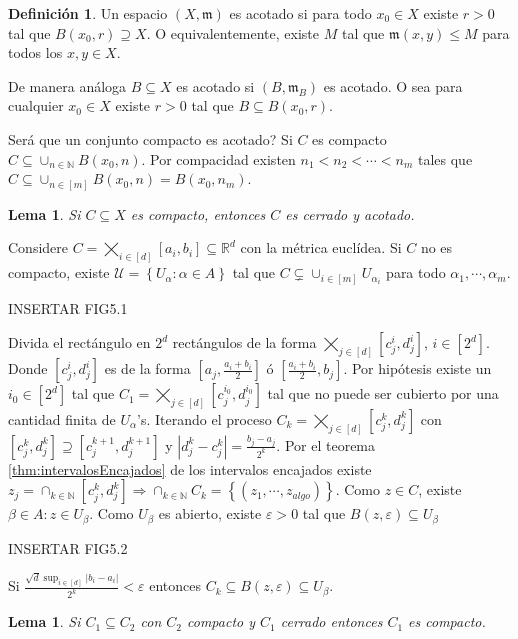 \documentclass[12pt]{article}
\theoremstyle{plain}
\newtheorem{Lem}[Th]{Lema}             %
\theoremstyle{definition}
\newtheorem{Def}[Th]{Definición}       %
\theoremstyle{remark}
\numberwithin{equation}{section}
\newcommand{\bN}{\mathbb{N}}        %
\newcommand{\bR}{\mathbb{R}}        %
\newcommand{\mm}{\mathfrak{m}}      %
\newcommand{\cU}{\mathcal{U}}       %
\renewcommand{\leq}{\leqslant}      %
\renewcommand{\:}{\colon}           %
\newcommand{\conj}[1]{\left\lbrace#1\right\rbrace}
\newcommand{\bonj}[1]{\left\lbrack#1\right\rbrack}
\begin{document}
\begin{multicols}{2}
\begin{Def}
  Un espacio $(X,\mm)$ es acotado si para todo $x_0\in X$ existe $r>0$ tal que $B(x_0,r)\supseteq X$. O equivalentemente, existe $M$ tal que $\mm(x,y)\leq M$ para todos los $x,y\in X$.\par
  De manera análoga $B\subseteq X$ es acotado si $(B,\mm_B)$ es acotado. O sea para cualquier $x_0\in X$ existe $r>0$ tal que $B\subseteq B(x_0,r)$.
\end{Def}
Será que un conjunto compacto es acotado? Si $C$ es compacto $C\subseteq\cup_{n\in\bN}B(x_0,n)$. Por compacidad existen $n_1<n_2<\cdots<n_m$ tales que $C\subseteq\cup_{n\in\bonj{m}}B(x_0,n)=B(x_0,n_m)$.

\begin{Lem}
  Si $C\subseteq X$ es compacto, entonces $C$ es cerrado y acotado.
\end{Lem}

Considere $C=\bigtimes_{i\in\bonj{d}}\bonj{a_i,b_i}\subseteq\bR^d$ con la métrica euclídea. Si $C$ no es compacto, existe $\cU=\conj{U_\alpha\colon\alpha\in A}$ tal que $C\subsetneq\cup_{i\in\bonj{m}}U_{\alpha_i}$ para todo $\alpha_1,\cdots,\alpha_m$.\par
INSERTAR FIG5.1
\par
Divida el rectángulo en $2^d$ rectángulos de la forma $\bigtimes_{j\in\bonj{d}}\bonj{c^i_j,d^i_j}$, $i\in\bonj{2^d}$. Donde $\bonj{c^i_j,d^i_j}$ es de la forma $\bonj{a_j,\frac{a_i+b_i}{2}}$ ó $\bonj{\frac{a_i+b_i}{2},b_j}$. Por hipótesis existe un $i_0\in\bonj{2^d}$ tal que $C_1=\bigtimes_{j\in\bonj{d}}\bonj{c_j^{i_0},d_j^{i_0}}$ tal que no puede ser cubierto por una cantidad finita de $U_\alpha$'s.
Iterando el proceso $C_k=\bigtimes_{j\in\bonj{d}}\bonj{c_j^k,d_j^k}$ con $\bonj{c_j^k,d_j^k}\supseteq\bonj{c_j^{k+1},d_j^{k+1}}$ y $|d_j^k-c_j^k|=\frac{b_j-a_j}{2^k}$. Por el teorema \ref{thm:intervalosEncajados} de los intervalos encajados existe $z_j=\cap_{k\in\bN}\bonj{c_j^k,d_j^k}\Rightarrow \cap_{k\in\bN}C_k=\conj{(z_1,\cdots,z_{algo})}$. Como $z\in C$, existe $\beta\in A\colon z\in U_\beta$. Como $U_\beta$ es abierto, existe $\varepsilon>0$ tal que $B(z,\varepsilon)\subseteq U_\beta$\par
INSERTAR FIG5.2
\par
Si $\frac{\sqrt{d}\sup_{i\in\bonj{d}}|b_i-a_i|}{2^k}<\varepsilon$ entonces $C_k\subseteq B(z,\varepsilon)\subseteq U_\beta$.

\begin{Lem}
  Si $C_1\subseteq C_2$ con $C_2$ compacto y $C_1$ cerrado entonces $C_1$ es compacto.
\end{Lem}


\end{multicols}
\end{document}
